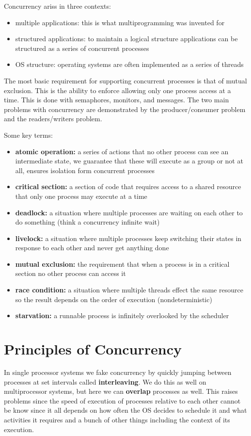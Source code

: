 \documentclass[12pt]{article}
\begin{document}

Concurrency ariss in three contexts:
\begin{itemize}
    \item multiple applications: this is what multiprogramming was invented for
    \item structured applications: to maintain a logical structure applications can be structured as a series of concurrent processes
    \item OS structure: operating systems are often implemented as a series of threads
\end{itemize}

The most basic requirement for supporting concurrent processes is that of mutual exclusion. This is the ability to enforce allowing only one process access at a time. This is done with semaphores, monitors, and messages. The two main problems with concurrency are demonstrated by the producer/consumer problem and the readers/writers problem.

Some key terms:
\begin{itemize}
    \item \textbf{atomic operation:} a series of actions that no other process can see an intermediate state, we guarantee that these will execute as a group or not at all, ensures isolation form concurrent processes
    \item \textbf{critical section:} a section of code that requires access to a shared resource that only one process may execute at a time
    \item \textbf{deadlock:} a situation where multiple processes are waiting on each other to do something (think a concurrency infinite wait)
    \item \textbf{livelock:} a situation where multiple processes keep switching their states in response to each other and never get anything done
    \item \textbf{mutual exclusion:} the requirement that when a process is in a critical section no other process can access it
    \item \textbf{race condition:} a situation where multiple threads effect the same resource so the result depends on the order of execution (nondeterministic)
    \item \textbf{starvation:} a runnable process is infinitely overlooked by the scheduler
\end{itemize}

\section{Principles of Concurrency}
In single processor systems we fake concurrency by quickly jumping between processes at set intervals called \textbf{interleaving}. We do this as well on multiprocessor systems, but here we can \textbf{overlap} processes as well. This raises problems since the speed of execution of processes relative to each other cannot be know since it all depends on how often the OS decides to schedule it and what activities it requires and a bunch of other things including the context of its execution.
\end{document}
